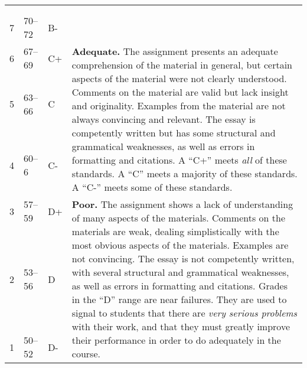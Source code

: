 \documentclass[12pt]{article}
\begin{document}
{\begin{tabular}{|l|l|l|l|}
& & & \\
& & & \\
\multirow{3}{*}{7} & \multirow{3}{*}{70--72} & \multirow{3}{*}{B-} & \\
& & & \\
& & & \\
\hline
\multirow{3}{*}{6} & \multirow{3}{*}{67--69} & \multirow{3}{*}{C+} & \multirow{9}{4in}{\textbf{Adequate.} The assignment presents an adequate comprehension of the material in general, but certain aspects of the material were not clearly understood. Comments on the material are valid but lack insight and originality. Examples from the material are not always convincing and relevant. The essay is competently written but has some structural and grammatical weaknesses, as well as errors in formatting and citations. A ``C+'' meets \textit{all} of these standards. A ``C'' meets a majority of these standards. A ``C-'' meets some of these standards.} \\
& & & \\
& & & \\
\multirow{3}{*}{5} & \multirow{3}{*}{63--66} & \multirow{3}{*}{C} & \\
& & & \\
& & & \\
\multirow{3}{*}{4} & \multirow{3}{*}{60--6} & \multirow{3}{*}{C-} & \\
& & & \\
& & & \\
\hline
\multirow{3}{*}{3} & \multirow{3}{*}{57--59} & \multirow{3}{*}{D+} & \multirow{9}{4in}{\textbf{Poor.} The assignment shows a lack of understanding of many aspects of the materials. Comments on the materials are weak, dealing simplistically with the most obvious aspects of the materials. Examples are not convincing. The essay is not competently written, with several structural and grammatical weaknesses, as well as errors in formatting and citations. Grades in the ``D'' range are near failures. They are used to signal to students that there are \textit{very serious problems} with their work, and that they must greatly improve their performance in order to do adequately in the course.} \\
& & & \\
& & & \\
\multirow{3}{*}{2} & \multirow{3}{*}{53--56} & \multirow{3}{*}{D} & \\
& & & \\
& & & \\
\multirow{3}{*}{1} & \multirow{3}{*}{50--52} & \multirow{3}{*}{D-} & \\

\end{tabular}}
\end{document}
